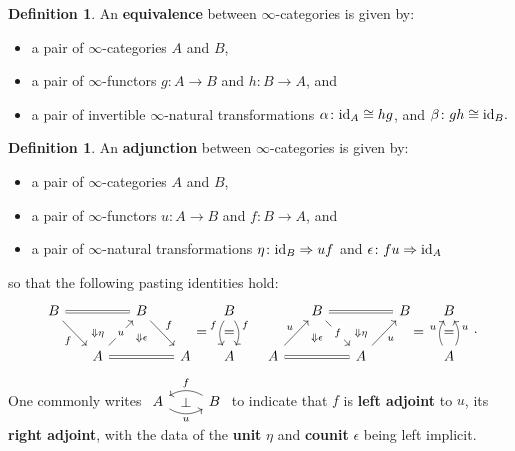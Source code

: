 \documentclass[11pt]{ctexart}
\theoremstyle{definition}
\newtheorem{defn}[thm]{Definition}
\theoremstyle{remark}
\numberwithin{equation}{section}
\newcommand{\id}{\textup{id}}
\newcommand{\To}{\Rightarrow}
\newcommand{\1}{\mathbbe{1}}
\newcommand{\2}{\mathbbe{2}}
\newcommand{\3}{\mathbbe{3}}
\begin{document}
\begin{defn}\label{defn:equivalence} An \textbf{equivalence} between $\infty$-categories is given by:
    \begin{itemize}
        \item a pair of $\infty$-categories $A$ and $B$,
        \item a pair of $\infty$-functors $g \colon A \to B$ and $h \colon B \to A$, and
        \item a pair of invertible $\infty$-natural transformations $\alpha \colon \id_A \cong h g$, and $\beta \colon g h \cong  \id_B.$
  \end{itemize}
\end{defn}

\begin{defn}\label{defn:adjunction}
    An \textbf{adjunction} between $\infty$-categories is given by:
    \begin{itemize}
        \item a pair of $\infty$-categories $A$ and $B$,
        \item a pair of $\infty$-functors $u \colon A \to B$ and $f \colon B \to A$, and
        \item a pair of $\infty$-natural transformations $\eta \colon \id_B \To uf$ and $\epsilon \colon fu \To \id_A$
    \end{itemize}
    so that the following pasting identities hold:
    \[
        \begin{tikzcd}[column sep=1.5em]
            B \arrow[dr, "f"'] \arrow[rr, equals] & \arrow[d, phantom, "\scriptstyle\Downarrow\eta"] & B \arrow[dr, "f"] \arrow[d, phantom, "\scriptstyle\Downarrow\epsilon"] & & B  \arrow[d, bend left, "f"] \arrow[d, bend right, "f"'] \arrow[d, phantom, "="] & & B \arrow[d, phantom, "\scriptstyle\Downarrow\epsilon"] \arrow[rr, equals] \arrow[dr, "f" description] &\arrow[d, phantom, "\scriptstyle\Downarrow\eta"] & B \arrow[dr, phantom, "=\quad"] & B \\
            & A \arrow[ur, "u" description] \arrow[rr, equals] & ~ & A \arrow[ur, phantom, "=\quad"] & A & A \arrow[ur, "u"] \arrow[rr, equals] & ~ & A \arrow[ur, "u"'] & & A \arrow[u, bend left, "u"] \arrow[u, bend right, "u"'] \arrow[u, phantom, "="]
        \end{tikzcd} \, .
    \]
One commonly writes $\begin{tikzcd}
        A \arrow[r, bend right, "u"'] \arrow[r, phantom, "\bot"] & B \arrow[l, bend right, "f"']
    \end{tikzcd}$ 
    to indicate that $f$ is \textbf{left adjoint} to $u$, its \textbf{right adjoint}, with the data of the \textbf{unit} $\eta$ and \textbf{counit} $\epsilon$ being left implicit.
\end{defn}
\end{document}
